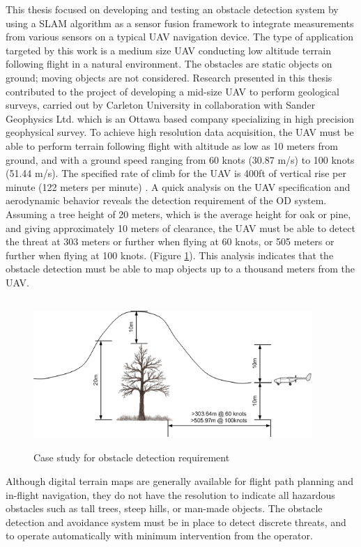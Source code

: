 This thesis focused on developing and testing an obstacle detection
system by using a SLAM algorithm as a sensor fusion framework to
integrate measurements from various sensors on a typical UAV
navigation device. The type of application targeted by this work is a
medium size UAV conducting low altitude terrain following flight in a
natural environment. The obstacles are static objects on ground;
moving objects are not considered. Research presented in this thesis
contributed to the project of developing a mid-size UAV to perform
geological surveys, carried out by Carleton University in
collaboration with Sander Geophysics Ltd. which is an Ottawa based
company specializing in high precision geophysical survey. To achieve
high resolution data acquisition, the UAV must be able to perform
terrain following flight with altitude as low as 10 meters from
ground, and with a ground speed ranging from 60 knots (30.87 m/s) to
100 knots (51.44 m/s). The specified rate of climb for the UAV is
400ft of vertical rise per minute (122 meters per minute)
\cite{james_geosurv_2008}. A quick analysis on the UAV specification
and aerodynamic behavior reveals the detection requirement of the OD
system. Assuming a tree height of 20 meters, which is the average
height for oak or pine, and giving approximately 10 meters of
clearance, the UAV must be able to detect the threat at 303 meters or
further when flying at 60 knots, or 505 meters or further when flying
at 100 knots. (Figure \ref{ob}). This analysis indicates that the
obstacle detection must be able to map objects up to a thousand meters
from the UAV.

\begin{figure}[h]
\centering
\includegraphics[width=300pt,height=160pt]{./Figures/ProblemStatement.png}
\caption {Case study for obstacle detection requirement}
\label{ob}
\end{figure}

Although digital terrain maps are generally available for flight path
planning and in-flight navigation, they do not have the resolution to
indicate all hazardous obstacles such as tall trees, steep hills, or
man-made objects. The obstacle detection and avoidance system must be
in place to detect discrete threats, and to operate automatically with
minimum intervention from the operator.

